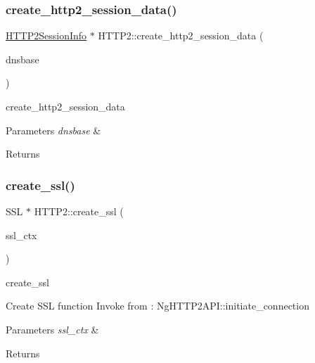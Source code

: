 \subsubsection{\texorpdfstring{create\+\_\+http2\+\_\+session\+\_\+data()}{create\_http2\_session\_data()}}
{\footnotesize\ttfamily \hyperlink{classhttp2_1_1HTTP2SessionInfo}{H\+T\+T\+P2\+Session\+Info} $\ast$ H\+T\+T\+P2\+::create\+\_\+http2\+\_\+session\+\_\+data (\begin{DoxyParamCaption}\item[{struct evdns\+\_\+base $\ast$}]{dnsbase }\end{DoxyParamCaption})\hspace{0.3cm}{\ttfamily [static]}}



create\+\_\+http2\+\_\+session\+\_\+data 


\begin{DoxyParams}{Parameters}
{\em dnsbase} & \\
\hline
\end{DoxyParams}
\begin{DoxyReturn}{Returns}

\end{DoxyReturn}
\mbox{\label{classhttp2_1_1HTTP2_a85c98f99f777e47a20994843c64152e5}} 
\subsubsection{\texorpdfstring{create\+\_\+ssl()}{create\_ssl()}}
{\footnotesize\ttfamily S\+SL $\ast$ H\+T\+T\+P2\+::create\+\_\+ssl (\begin{DoxyParamCaption}\item[{S\+S\+L\+\_\+\+C\+TX $\ast$}]{ssl\+\_\+ctx }\end{DoxyParamCaption})\hspace{0.3cm}{\ttfamily [static]}}



create\+\_\+ssl 

Create S\+SL function Invoke from \+: Ng\+H\+T\+T\+P2\+A\+P\+I\+::initiate\+\_\+connection 
\begin{DoxyParams}{Parameters}
{\em ssl\+\_\+ctx} & \\
\hline
\end{DoxyParams}
\begin{DoxyReturn}{Returns}

\end{DoxyReturn}
\mbox{\label{classhttp2_1_1HTTP2_acfca7c774fb30ce95e0ee51edcb4c729}} 
